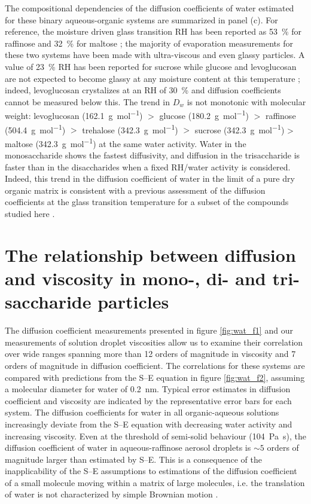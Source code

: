 The compositional dependencies of the diffusion coefficients of water estimated for these binary aqueous-organic systems are summarized in panel (c). For reference, the moisture driven glass transition RH has been reported as \SI{53}{\percent} for raffinose \cite{Song2016a,Tong2011} and \SI{32}{\percent} for maltose \cite{Song2016a}; the majority of evaporation measurements for these two systems have been made with ultra-viscous and even glassy particles. A value of \SI{23}{\percent} RH has been reported for sucrose \cite{Song2016a,Tong2011} while glucose and levoglucosan are not expected to become glassy at any moisture content at this temperature \cite{Zobrist2008}; indeed, levoglucosan crystalizes at an RH of \SI{30}{\percent} and diffusion coefficients cannot be measured below this. The trend in $D_{w}$ is not monotonic with molecular weight: levoglucosan (\SI{162.1}{\gram\per\mol}) $>$ glucose (\SI{180.2}{\gram\per\mol}) $>$ raffinose (\SI{504.4}{\gram\per\mole}) $>$ trehalose (\SI{342.3}{\gram\per\mole}) $>$ sucrose (\SI{342.3}{\gram\per\mol}) > maltose (\SI{342.3}{\gram\per\mole}) at the same water activity. Water in the monosaccharide shows the fastest diffusivity, and diffusion in the trisaccharide is faster than in the disaccharides when a fixed RH/water activity is considered. Indeed, this trend in the diffusion coefficient of water in the limit of a pure dry organic matrix is consistent with a previous assessment of the diffusion coefficients at the glass transition temperature for a subset of the compounds studied here \cite{lienhard2015viscous}.

\section{The relationship between diffusion and viscosity in mono-, di- and tri-saccharide particles}\label{sec:wat_d_eta}

The diffusion coefficient measurements presented in figure \ref{fig:wat_f1} and our measurements of solution droplet viscosities \cite{Song2016a} allow us to examine their correlation over wide ranges spanning more than \num{12} orders of magnitude in viscosity and \num{7} orders of magnitude in diffusion coefficient. The correlations for these systems are compared with predictions from the S–E equation in figure \ref{fig:wat_f2}, assuming a molecular diameter for water of \SI{0.2}{\nano\meter}. Typical error estimates in diffusion coefficient and viscosity are indicated by the representative error bars for each system. The diffusion coefficients for water in all organic-aqueous solutions increasingly deviate from the S–E equation with decreasing water activity and increasing viscosity. Even at the threshold of semi-solid behaviour (\SI{104}{\pascal\second}), the diffusion coefficient of water in aqueous-raffinose aerosol droplets is $\sim \num{5}$ orders of magnitude larger than estimated by S–E. This is a consequence of the inapplicability of the S–E assumptions to estimations of the diffusion coefficient of a small molecule moving within a matrix of large molecules, i.e. the translation of water is not characterized by simple Brownian motion \cite{Chen2006a,Liu2015}.

